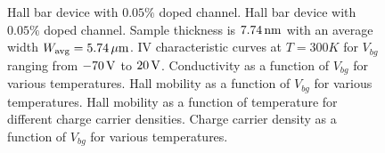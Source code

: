 \begin{figure}[ht]
	\caption[Hall measurement data for $0.05\%$  doped  channel]{\protect{} Hall bar device with $0.05\%$  doped  channel. Hall bar device with $0.05\%$  doped  channel. Sample thickness is $7.74\,\mathrm{nm}$ with an average width $W_\mathrm{avg}=5.74\,\mathrm{\mu m}$. \protect{} IV characteristic curves at $T=300K$ for $V_{bg}$ ranging from $-70\,\mathrm{V}$ to $20\,\mathrm{V}$. \protect{} Conductivity as a function of $V_{bg}$ for various temperatures. \protect{} Hall mobility as a function of $V_{bg}$ for various temperatures. \protect{} Hall mobility as a function of temperature for different charge carrier densities. \protect{} Charge carrier density as a function of $V_{bg}$ for various temperatures.}
	\label{fig:hall_measurement_data1}
\end{figure}

